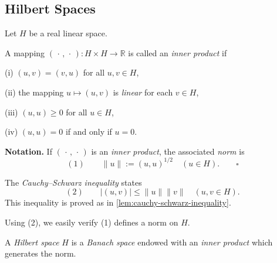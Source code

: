 \subsection{Hilbert Spaces}
\label{sec:hilbert-spaces}

Let $H$ be a real linear space.

\begin{definition}
\label{def:inner-product}
A mapping $(\,\cdot\,,\,\cdot\,) : H \times H \to \mathbb{R}$ is called an \textit{inner product} if

(i) $(u, v) = (v, u)$ for all $u, v \in H$,

(ii) the mapping $u \mapsto (u, v)$ is \textit{linear} for each $v \in H$,

(iii) $(u, u) \ge 0$ for all $u \in H$,

(iv) $(u, u) = 0$ if and only if $u = 0$.
\end{definition}

\begin{definition}
\label{def:norm-from-inner-product}
\textbf{Notation.} If $(\,\cdot\,,\,\cdot\,)$ is an \textit{inner product}, the associated \textit{norm} is
$$(1) \qquad \|u\| := (u, u)^{1/2} \quad (u \in H). \qquad \square$$
\end{definition}

\begin{lemma}
\label{lem:cauchy-schwarz-inequality-hilbert}
The \textit{Cauchy--Schwarz inequality} states
$$(2) \qquad |(u, v)| \le \|u\| \|v\| \quad (u, v \in H).$$
This inequality is proved as in \cref{lem:cauchy-schwarz-inequality}.
\end{lemma}

Using (2), we easily verify (1) defines a norm on $H$.

\begin{definition}
\label{def:hilbert-space}
A \textit{Hilbert space} $H$ is a \textit{Banach space} endowed with an \textit{inner product} which generates the norm.
\end{definition}

